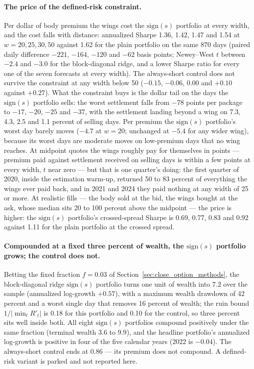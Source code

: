 \paragraph{The price of the defined-risk constraint.} Per dollar of
body premium the wings cost the $\mathrm{sign}(s)$ portfolio at every width, and
the cost falls with distance: annualized Sharpe 1.36, 1.42, 1.47 and
1.54 at $w = 20, 25, 30, 50$ against 1.62 for the plain portfolio on the
same 870 days (paired daily difference $-221$, $-164$, $-120$ and $-62$
basis points; Newey--West $t$ between $-2.4$ and $-3.0$ for the
block-diagonal ridge, and a lower Sharpe ratio for every one of the seven
forecasts at every width). The always-short control does not survive the constraint at
any width below 50 ($-0.15$, $-0.06$, $0.00$ and $+0.10$ against
$+0.27$). What the constraint buys is the dollar tail on the days the
$\mathrm{sign}(s)$ portfolio sells:
the worst settlement falls from $-78$ points per package to $-17$,
$-20$, $-25$ and $-37$, with the settlement landing beyond a wing on
7.3, 4.3, 2.5 and 1.1 percent of selling days. Per premium the
$\mathrm{sign}(s)$ portfolio's worst day barely moves ($-4.7$ at $w=20$; unchanged
at $-5.4$ for any wider wing), because its worst days are moderate
moves on low-premium days that no wing reaches. At midpoint quotes the
wings roughly pay for themselves in points --- premium paid against
settlement received on selling days is within a few points at every
width, $t$ near zero --- but that is one quarter's doing: the first
quarter of 2020, inside the estimation warm-up, returned 50 to 83
percent of everything the wings ever paid back, and in 2021 and 2024
they paid nothing at any width of 25 or more. At realistic fills ---
the body sold at the bid, the wings bought at the ask, whose median
sits 20 to 100 percent above the midpoint --- the price is higher: the
$\mathrm{sign}(s)$ portfolio's crossed-spread Sharpe is 0.69, 0.77, 0.83 and 0.92 against
1.11 for the plain portfolio at the crossed spread.
\fi

\paragraph{Compounded at a fixed three percent of wealth, the $\mathrm{sign}(s)$
portfolio grows; the control does not.} Betting the fixed fraction
$f=0.03$ of Section~\ref{sec:close_option_methods}, the block-diagonal ridge
$\mathrm{sign}(s)$ portfolio turns one unit of wealth into $7.2$ over the
sample (annualized log-growth $+0.57$), with a maximum wealth drawdown
of 42 percent and a worst single day that removes 16 percent of
wealth; the ruin bound $1/|\min_t R'_t|$ is 0.18 for this portfolio and
0.10 for the control, so three percent sits well inside both. All eight
$\mathrm{sign}(s)$ portfolios compound positively under the same fraction (terminal
wealth $3.6$ to $9.9$), and the headline portfolio's annualized
log-growth is positive in four of the five calendar years (2022 is $-0.04$). The
always-short control ends at $0.86$ --- its premium does not compound. A defined-risk variant is
parked and not reported here.

